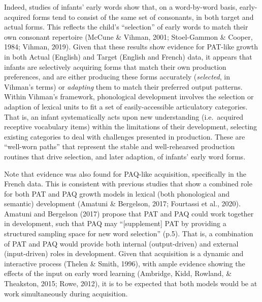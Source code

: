 \documentclass[
  english,
  man,floatsintext]{apa6}
\begin{document}
Indeed, studies of infants' early words show that, on a word-by-word basis, early-acquired forms tend to consist of the same set of consonants, in both target and actual forms. This reflects the child's \enquote{selection} of early words to match their own consonant repertoire (McCune \& Vihman, 2001; Stoel-Gammon \& Cooper, 1984; Vihman, 2019). Given that these results show evidence for PAT-like growth in both Actual (English) and Target (English and French) data, it appears that infants are selectively acquiring forms that match their own production preferences, and are either producing these forms accurately (\emph{selected}, in Vihman's terms) or \emph{adapting} them to match their preferred output patterns. Within Vihman's framework, phonological development involves the selection or adaption of lexical units to fit a set of easily-accessible articulatory categories. That is, an infant systematically acts upon new understanding (i.e.~acquired receptive vocabulary items) within the limitations of their development, selecting existing categories to deal with challenges presented in production. These are \enquote{well-worn paths} that represent the stable and well-rehearsed production routines that drive selection, and later adaption, of infants' early word forms.

Note that evidence was also found for PAQ-like acquisition, specifically in the French data. This is consistent with previous studies that show a combined role for both PAT and PAQ growth models in lexical (both phonological and semantic) development (Amatuni \& Bergelson, 2017; Fourtassi et al., 2020). Amatuni and Bergelson (2017) propose that PAT and PAQ could work together in development, such that PAQ may \enquote{{[}supplement{]} PAT by providing a structured sampling space for new word selection} (p.5). That is, a combination of PAT and PAQ would provide both internal (output-driven) and external (input-driven) roles in development. Given that acquisition is a dynamic and interactive process (Thelen \& Smith, 1996), with ample evidence showing the effects of the input on early word learning (Ambridge, Kidd, Rowland, \& Theakston, 2015; Rowe, 2012), it is to be expected that both models would be at work simultaneously during acquisition.
\end{document}
